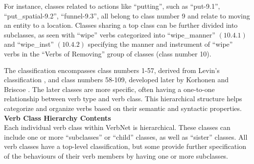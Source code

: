 For instance, classes related to actions like \enquote{putting}, such as \enquote{put-9.1}, \enquote{put\_spatial-9.2}, \enquote{funnel-9.3}, all belong to class number 9 and relate to moving an entity to a location. Classes sharing a top class can be further divided into subclasses, as seen with \enquote{wipe} verbs categorized into \enquote{wipe\_manner} $(10.4.1)$ and \enquote{wipe\_inst} $(10.4.2)$ specifying the manner and instrument of \enquote{wipe} verbs in the \enquote{Verbs of Removing} group of classes (class number 10).

The classification encompasses class numbers 1-57, derived from Levin's classification \cite{levin1993english}, and class numbers 58-109, developed later by Korhonen and Briscoe \cite{korhonen2004extended}. The later classes are more specific, often having a one-to-one relationship between verb type and verb class. This hierarchical structure helps categorize and organize verbs based on their semantic and syntactic properties.\\ 
\textbf{Verb Class Hierarchy Contents}\\ 
Each individual verb class within VerbNet is hierarchical. These classes can include one or more \enquote{subclasses} or \enquote{child} classes, as well as \enquote{sister} classes. All verb classes have a top-level classification, but some provide further specification of the behaviours of their verb members by having one or more subclasses. 

